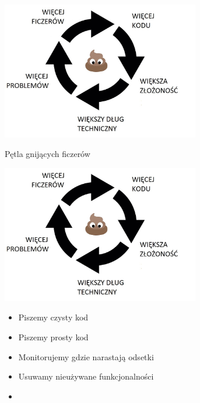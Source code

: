 \documentclass{beamer}
\begin{document}
\begin{frame}{}
\begin{center}
  	\includegraphics[height=6cm]{pgf7.jpg}
\end{center}
\end{frame}

\begin{frame}{Pętla gnijących ficzerów}
\begin{center}
  	\includegraphics[height=6cm]{pgf7.jpg}
\end{center}
\end{frame}

\begin{frame}{}
     \begin{Large}
	\begin{itemize}
		\item Piszemy czysty kod
		\item Piszemy prosty kod
		\item Monitorujemy gdzie narastają odsetki
		\item Usuwamy nieużywane funkcjonalności
		\item 
	\end{itemize}
     \end{Large}
\end{frame}
\end{document}

